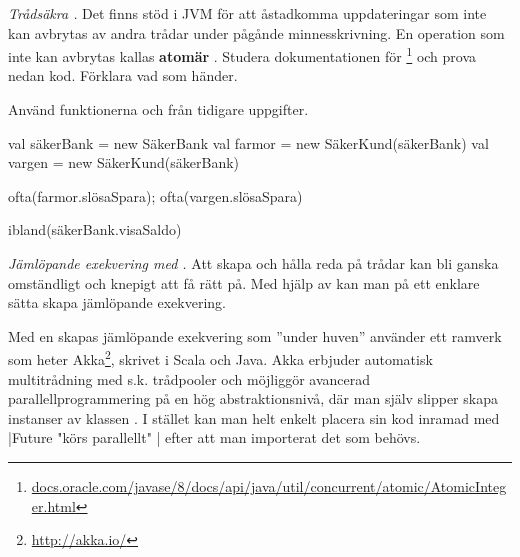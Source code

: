 \Task \emph{Trådsäkra .} Det finns stöd i JVM för att åstadkomma uppdateringar som inte kan avbrytas av andra trådar under pågånde minnesskrivning. En operation som inte kan avbrytas kallas \textbf{atomär} . Studera dokumentationen för \footnote{\href{https://docs.oracle.com/javase/8/docs/api/java/util/concurrent/atomic/AtomicInteger.html}{docs.oracle.com/javase/8/docs/api/java/util/concurrent/atomic/AtomicInteger.html}} och prova nedan kod. Förklara vad som händer.

Använd funktionerna  och  från tidigare uppgifter.
\begin{REPL}
val säkerBank = new SäkerBank
val farmor = new SäkerKund(säkerBank) 
val vargen = new SäkerKund(säkerBank) 

ofta(farmor.slösaSpara); ofta(vargen.slösaSpara)

ibland(säkerBank.visaSaldo)
\end{REPL}





\Task \label{task:future} \emph{Jämlöpande exekvering med .} Att skapa och hålla reda på trådar kan bli ganska omständligt och knepigt att få rätt på. 
Med hjälp av  kan man på ett enklare sätta skapa jämlöpande exekvering. 

\begin{Background}
Med en  skapas jämlöpande exekvering som ''under huven'' använder ett ramverk som heter Akka\footnote{\url{http://akka.io/}}, skrivet i Scala och Java. Akka erbjuder automatisk  multitrådning med s.k. trådpooler och möjliggör avancerad parallellprogrammering på en hög  abstraktionsnivå, där man själv slipper skapa instanser av klassen . I stället kan man helt enkelt placera sin kod inramad med \code|Future{ "körs parallellt" }| efter att man importerat det som behövs.
\end{Background}


